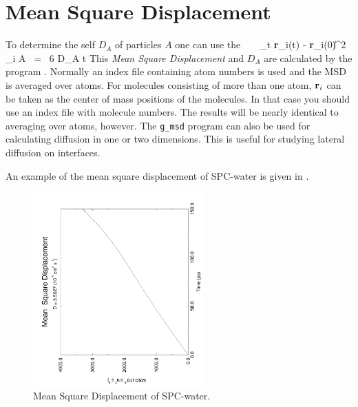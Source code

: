 \section{Mean Square Displacement}
\label{sec:msd}
To determine the self  $D_A$ of
particles $A$ one can use the ~\cite{Allen87} \
\beq 
\lim_{t \rightarrow \infty} \langle
\|{\bf r}_i(t) - {\bf r}_i(0)\|^2 \rangle_{i \in A} ~=~ 6 D_A t 
\eeq
This {\em Mean Square Displacement} and $D_A$ are calculated by the
program {\tt \normindex{g\_msd}}. Normally an index file containing
atom numbers is used and the MSD is averaged over atoms.  For
molecules consisting of more than one atom, ${\bf r}_i$ can be taken
as the center of mass positions of the molecules. In that case you
should use an index file with molecule numbers. The results will be
nearly identical to averaging over atoms, however. The {\tt g\_msd}
program can
also be used for calculating diffusion in one or two dimensions. This
is useful for studying lateral diffusion on interfaces.

An example of the mean square displacement of SPC-water is given in
\figref{msdwater}.

\begin{figure}
\centerline{
{\includegraphics[width=6.5cm,angle=270]{plots/msdwater}}}
\caption{Mean Square Displacement of SPC-water.}
\label{fig:msdwater}
\end{figure}

